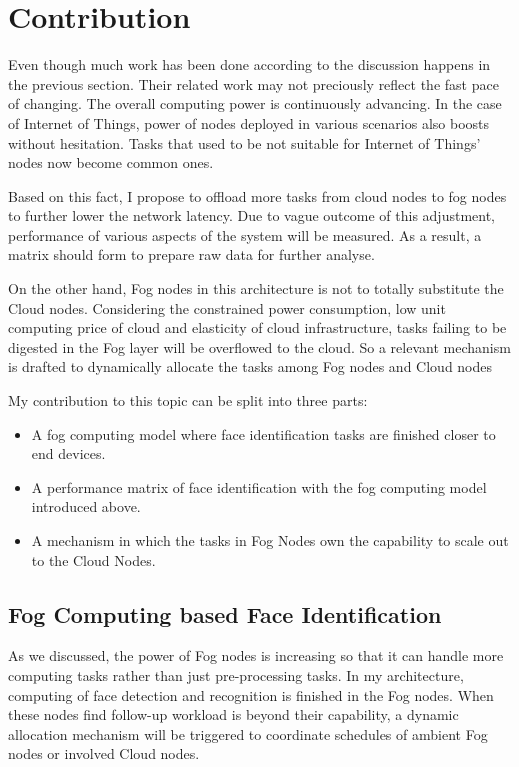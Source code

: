 \chapter{Contribution} \label{chap:contribution}

Even though much work has been done according to the discussion happens in the previous section. Their related work may not preciously reflect the fast pace of changing. The overall computing power is continuously advancing. In the case of Internet of Things, power of nodes deployed in various scenarios also boosts without hesitation. Tasks that used to be not suitable for Internet of Things' nodes now become common ones. 

Based on this fact, I propose to offload more tasks from cloud nodes to fog nodes to further lower the network latency. Due to vague outcome of this adjustment, performance of various aspects of the system will be measured. As a result, a matrix should form to prepare raw data for further analyse.

On the other hand, Fog nodes in this architecture is not to totally substitute the Cloud nodes. Considering the constrained power consumption, low unit computing price of cloud and elasticity of cloud infrastructure, tasks failing to be digested in the Fog layer will be overflowed to the cloud. So a relevant mechanism is drafted to dynamically allocate the tasks among Fog nodes and Cloud nodes

My contribution to this topic can be split into three parts:
\begin{itemize}
    \item A fog computing model where face identification tasks are finished closer to end devices.
    \item A performance matrix of face identification with the fog computing model introduced above.
    \item A mechanism in which the tasks in Fog Nodes own the capability to scale out to the Cloud Nodes.
\end{itemize}

\section{Fog Computing based Face Identification}
As we discussed, the power of Fog nodes is increasing so that it can handle more computing tasks rather than just pre-processing tasks. In my architecture, computing of face detection and recognition is finished in the Fog nodes. When these nodes find follow-up workload is beyond their capability, a dynamic allocation mechanism will be triggered to coordinate schedules of ambient Fog nodes or involved Cloud nodes. 

